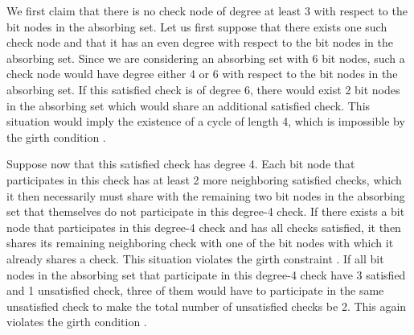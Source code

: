 We first claim that there is no check node of degree at least 3 with
respect to the bit nodes in the absorbing set. Let us first suppose
that there exists one such check node and that it has an even degree
with respect to the bit nodes in the absorbing set. Since we are
considering an absorbing set with 6 bit nodes, such a check node
would have degree either 4 or 6 with respect to the bit nodes in the
absorbing set. If this satisfied check is of degree 6, there would
exist 2 bit nodes in the absorbing set which would share an
additional satisfied check. This situation would imply the existence
of a cycle of length 4, which is impossible by the girth condition
\cite{fan}.

Suppose now that this satisfied check has degree 4. Each bit node
that participates in this check has at least 2 more neighboring
satisfied checks, which it then necessarily must share with the
remaining two bit nodes in the absorbing set that themselves do not
participate in this degree-4 check. If there exists a bit node that
participates in this degree-4 check and has all checks satisfied, it
then shares its remaining neighboring check with one of the bit
nodes with which it already shares a check. This situation violates
the girth constraint \cite{fan}. If all bit nodes in the absorbing
set that participate in this degree-4 check have 3 satisfied and 1
unsatisfied check, three of them would have to participate in the
same unsatisfied check to make the total number of unsatisfied
checks be 2. This again violates the girth condition \cite{fan}.

